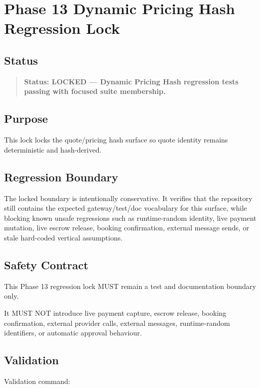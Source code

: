 \section{Phase 13 Dynamic Pricing Hash Regression Lock}
\label{sec:phase13-dynamic-pricing-hash-regression-lock}

\subsection{Status}

\begin{quote}
\textbf{Status: LOCKED --- Dynamic Pricing Hash regression tests passing with focused suite membership.}
\end{quote}

\subsection{Purpose}

This lock locks the quote/pricing hash surface so quote identity remains deterministic and hash-derived.

\subsection{Regression Boundary}

The locked boundary is intentionally conservative. It verifies that the repository still contains the expected gateway/test/doc vocabulary for this surface, while blocking known unsafe regressions such as runtime-random identity, live payment mutation, live escrow release, booking confirmation, external message sends, or stale hard-coded vertical assumptions.

\subsection{Safety Contract}

This Phase 13 regression lock MUST remain a test and documentation boundary only.

It MUST NOT introduce live payment capture, escrow release, booking confirmation, external provider calls, external messages, runtime-random identifiers, or automatic approval behaviour.

\subsection{Validation}

Validation command:

